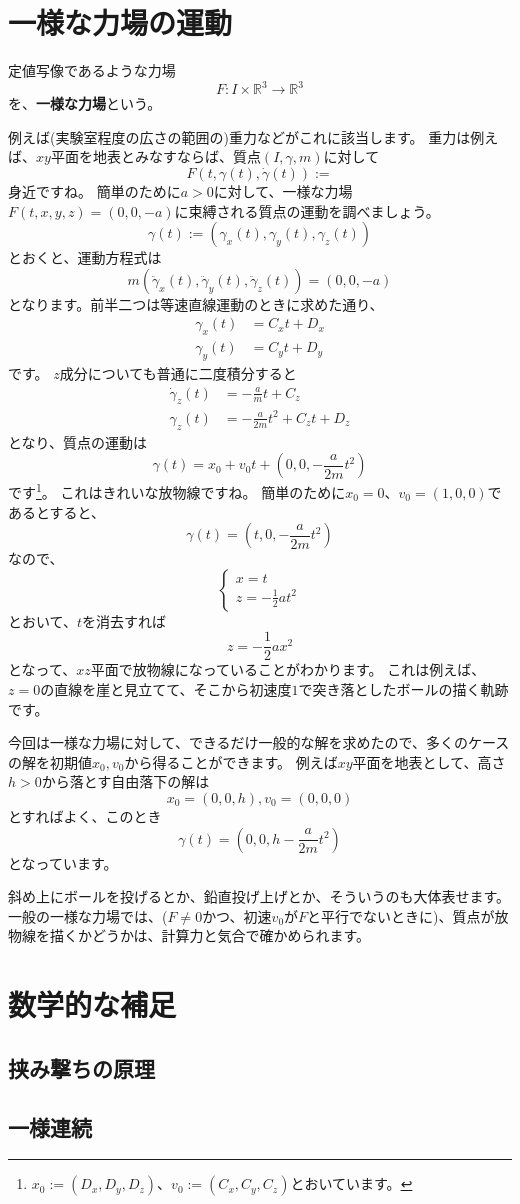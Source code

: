 \section{一様な力場の運動}

\begin{definition}
  定値写像であるような力場
  \[
    F:I\times\mathbb{R}^3\to\mathbb{R}^3
  \]
  を、\textbf{一様な力場}という。
\end{definition}

例えば(実験室程度の広さの範囲の)重力などがこれに該当します。
重力は例えば、$xy$平面を地表とみなすならば、質点$(I,\gamma,m)$に対して
\[
  F(t,\gamma(t),\dot\gamma(t)):=
\]
身近ですね。
簡単のために$a>0$に対して、一様な力場$F(t,x,y,z)=(0,0,-a)$に束縛される質点の運動を調べましょう。
\[
  \gamma(t):=(\gamma_x(t),\gamma_y(t),\gamma_z(t))
\]
とおくと、運動方程式は
\[
  m(\ddot\gamma_x(t),\ddot\gamma_y(t),\ddot\gamma_z(t))=(0,0,-a)
\]
となります。前半二つは等速直線運動のときに求めた通り、
\begin{align*}
  \gamma_x(t)&=C_xt+D_x\\
  \gamma_y(t)&=C_yt+D_y
\end{align*}
です。
$z$成分についても普通に二度積分すると
\begin{align*}
  \dot\gamma_z(t)&=-\frac{a}{m}t+C_z\\
  \gamma_z(t)&=-\frac{a}{2m}t^2+C_zt+D_z
\end{align*}
となり、質点の運動は
\[
  \gamma(t)=x_0+v_0t+\left(0,0,-\frac{a}{2m}t^2\right)
\]
です\footnote{
  $x_0:=(D_x,D_y,D_z)$、$v_0:=(C_x,C_y,C_z)$とおいています。
}。
これはきれいな放物線ですね。
簡単のために$x_0=0$、$v_0=(1,0,0)$であるとすると、
\[
  \gamma(t)=\left(t,0,-\frac{a}{2m}t^2\right)
\]
なので、
\[
  \begin{cases}
    x=t\\
    z=-\frac12at^2
  \end{cases}
\]
とおいて、$t$を消去すれば
\[
  z=-\frac12ax^2
\]
となって、$xz$平面で放物線になっていることがわかります。
これは例えば、$z=0$の直線を崖と見立てて、そこから初速度$1$で突き落としたボールの描く軌跡です。

今回は一様な力場に対して、できるだけ一般的な解を求めたので、多くのケースの解を初期値$x_0,v_0$から得ることができます。
例えば$xy$平面を地表として、高さ$h>0$から落とす自由落下の解は
\[
  x_0=(0,0,h), v_0=(0,0,0)
\]
とすればよく、このとき
\[
  \gamma(t)=\left(0,0,h-\frac{a}{2m}t^2\right)
\]
となっています。

斜め上にボールを投げるとか、鉛直投げ上げとか、そういうのも大体表せます。
一般の一様な力場では、($F\neq0$かつ、初速$v_0$が$F$と平行でないときに)、質点が放物線を描くかどうかは、計算力と気合で確かめられます。



\section{数学的な補足}

\subsection{挟み撃ちの原理}

\subsection{一様連続}\label{section:uniformly-continuous}
